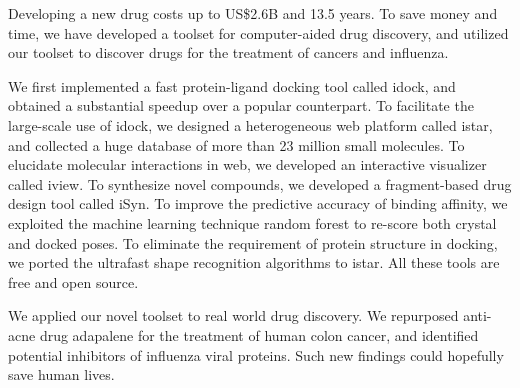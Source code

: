 Developing a new drug costs up to US\$2.6B and 13.5 years. To save money and time, we have developed a toolset for computer-aided drug discovery, and utilized our toolset to discover drugs for the treatment of cancers and influenza.

We first implemented a fast protein-ligand docking tool called idock, and obtained a substantial speedup over a popular counterpart. To facilitate the large-scale use of idock, we designed a heterogeneous web platform called istar, and collected a huge database of more than 23 million small molecules. To elucidate molecular interactions in web, we developed an interactive visualizer called iview. To synthesize novel compounds, we developed a fragment-based drug design tool called iSyn. To improve the predictive accuracy of binding affinity, we exploited the machine learning technique random forest to re-score both crystal and docked poses. To eliminate the requirement of protein structure in docking, we ported the ultrafast shape recognition algorithms to istar. All these tools are free and open source.

We applied our novel toolset to real world drug discovery. We repurposed anti-acne drug adapalene for the treatment of human colon cancer, and identified potential inhibitors of influenza viral proteins. Such new findings could hopefully save human lives.
